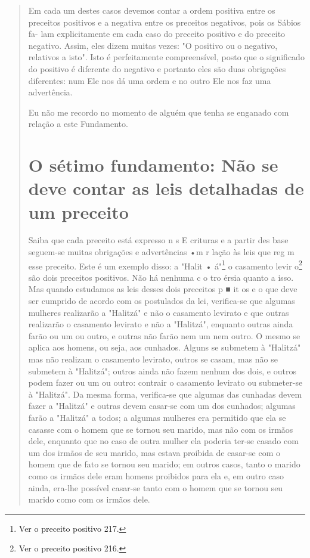 \begin{quote}
Em cada um destes casos devemos contar a ordem positiva entre os
preceitos positivos e a negativa entre os preceitos negativos, pois os
Sábios fa-
lam explicitamente em cada caso do preceito positivo e do preceito
negativo. Assim, eles dizem muitas vezes: "O positivo ou o negativo,
relativos a isto". Isto é perfeitamente compreensível, posto que o
significado do positivo é dife­rente do negativo e portanto eles são
duas obrigações diferentes: num Ele nos dá uma ordem e no outro Ele nos
faz uma advertência.

Eu não me recordo no momento de alguém que tenha se enganado com relação
a este Fundamento.

\chapter{O sétimo fundamento: Não se deve contar as leis detalhadas de um preceito}

Saiba que cada preceito está expresso n s E crituras e a partir des base
seguem-se muitas obrigações e advertências •m r lação às leis que reg m
esse preceito. Este é um exemplo disso:
a "Halit • á"\footnote{Ver o preceito positivo 217.}
o casamento levir o\footnote{Ver o preceito positivo 216.}
são dois preceitos positivos. Não
há nenhuma c o tro érsia quanto a isso. Mas quando estudamos as leis
desses dois preceitos p ■ it os e o que deve ser cum­prido de acordo com
os postulados da lei, verifica-se que algumas mulheres realizarão a
"Halitzá" e não o casamento levirato e que outras realizarão o
casa­mento levirato e não a "Halitzá", enquanto outras ainda farão ou um
ou outro, e outras não farão nem um nem outro. O mesmo se aplica aos
homens, ou seja, aos cunhados. Alguns se submetem à "Halitzá" mas não
realizam o casamento levirato, outros se casam, mas não se submetem à
"Halitzá"; outros ainda não fazem nenhum dos dois, e outros podem fazer
ou um ou outro: contrair o casa­mento levirato ou submeter-se à
"Halitzá". Da mesma forma, verifica-se que algumas das cunhadas devem
fazer a "Halitzá" e outras devem casar-se com um dos cunhados; algumas
farão a "Halitzá" a todos; a algumas mulheres era permitido que ela se
casasse com o homem que se tornou seu marido, mas não com os irmãos
dele, enquanto que no caso de outra mulher ela poderia ter-se casado com
um dos irmãos de seu marido, mas estava proibida de casar-se com o homem
que de fato se tornou seu marido; em outros casos, tanto o marido como
os irmãos dele eram homens proibidos para ela e, em outro caso ainda,
era-lhe possível casar-se tanto com o homem que se tornou seu marido
como com os irmãos dele.


\end{quote}
